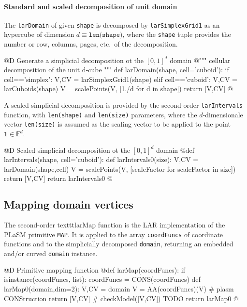 \documentclass[11pt,oneside]{article}	%
\def\E{\mathbb{E}}
\begin{document}
\paragraph{Standard and scaled decomposition of unit domain}
The \texttt{larDomain} of given \texttt{shape} is decomposed by \texttt{larSimplexGrid1} as an hypercube of dimension $d \equiv\texttt{len(shape)}$, where the \texttt{shape} tuple provides the number or row, columns, pages, etc.~of the decomposition.

@D Generate a simplicial decomposition ot the $[0,1]^d$ domain
@{""" cellular decomposition of the unit d-cube """
def larDomain(shape, cell='cuboid'):
	if cell=='simplex': V,CV = larSimplexGrid1(shape)
	elif cell=='cuboid': V,CV = larCuboids(shape)
	V = scalePoints(V, [1./d for d in shape])
	return [V,CV]
@}

A scaled simplicial decomposition is provided by the second-order  \texttt{larIntervals} function, with \texttt{len(shape)} and \texttt{len(size)} parameters, where the $d$-dimensionale vector \texttt{len(size)} is assumed as the scaling vector to be applied to the point $\mathbf{1}\in\E^d$.

@D Scaled simplicial decomposition ot the $[0,1]^d$ domain
@{def larIntervals(shape, cell='cuboid'):
	def larIntervals0(size):
		V,CV = larDomain(shape,cell)
		V = scalePoints(V, [scaleFactor for scaleFactor in size])
		return [V,CV]
	return larIntervals0
@}

\subsection{Mapping domain vertices}
The second-order texttt{larMap} function is the LAR implementation of the PLaSM primitive \texttt{MAP}.
It is applied to the array \texttt{coordFuncs} of coordinate functions and to the simplicially decomposed  \texttt{domain}, returning an embedded and/or curved \texttt{domain} instance.

@D Primitive mapping function 
@{def larMap(coordFuncs):
	if isinstance(coordFuncs, list): coordFuncs = CONS(coordFuncs)
	def larMap0(domain,dim=2):
		V,CV = domain
		V = AA(coordFuncs)(V)  # plasm CONStruction
		return [V,CV]
		# checkModel([V,CV])  TODO
	return larMap0
@}
\end{document}

